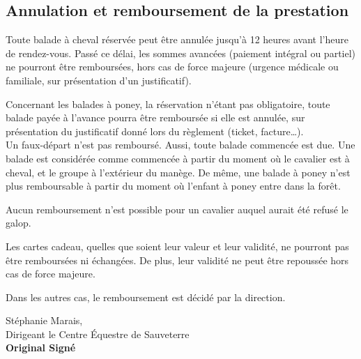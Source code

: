 \documentclass[11pt,a4paper]{article}
\begin{document}
   \subsection*{Annulation et remboursement de la prestation}
      Toute balade à cheval réservée peut être annulée jusqu'à 12 heures avant l'heure de rendez-vous.
      Passé ce délai, les sommes avancées (paiement intégral ou partiel) ne pourront être remboursées, hors cas de force majeure (urgence médicale ou familiale, sur présentation d'un justificatif).

      Concernant les balades à poney, la réservation n'étant pas obligatoire, toute balade payée à l'avance pourra être remboursée si elle est annulée, sur présentation du justificatif donné lors du règlement (ticket, facture\dots).
      \\

      Un faux-départ n'est pas remboursé.
      Aussi, toute balade commencée est due.
      Une balade est considérée comme \og commencée \fg{} à partir du moment où le cavalier est à cheval, et le groupe à l'extérieur du manège.
      De même, une balade à poney n'est plus remboursable à partir du moment où l'enfant à poney entre dans la forêt.

      Aucun remboursement n'est possible pour un cavalier auquel aurait été refusé le galop.

      Les cartes cadeau, quelles que soient leur valeur et leur validité, ne pourront pas être remboursées ni échangées.
      De plus, leur validité ne peut être repoussée hors cas de force majeure.

      Dans les autres cas, le remboursement est décidé par la direction.


   \vfill

   \hspace{.55\textwidth}
   \begin{minipage}{.4\textwidth}
      \begin{center}
         Stéphanie Marais,\\
         Dirigeant le Centre Équestre de Sauveterre\\
         \textbf{Original Signé}
      \end{center}
   \end{minipage}
\end{document}
